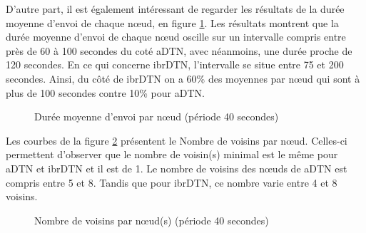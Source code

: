 \documentclass[a4paper,10pt]{article}
\begin{document}
D’autre part, il est également intéressant de regarder les résultats de la durée moyenne d'envoi de chaque nœud, en figure \ref{fig:40_avg_snd_duration}. Les résultats montrent que la durée moyenne d'envoi de chaque nœud oscille sur un intervalle compris entre près de 60 à 100 secondes du coté aDTN, avec néanmoins, une durée proche de 120 secondes. En ce qui concerne ibrDTN, l’intervalle se situe entre 75 et 200 secondes. Ainsi, du côté de ibrDTN on a 60\% des moyennes par nœud qui sont à plus de 100 secondes contre 10\% pour aDTN.\par

\begin{figure}[h!]
    \centering
    \caption{Durée moyenne d'envoi par nœud (période 40 secondes)}
    \label{fig:40_avg_snd_duration}
\end{figure}

Les courbes de la figure \ref{fig:40_nb_neighbors} présentent le Nombre de voisins par nœud. Celles-ci permettent d'observer que le nombre de voisin(s) minimal est le même pour aDTN et ibrDTN et il est de 1. Le nombre de voisins des nœuds de aDTN est compris entre 5 et 8. Tandis que pour ibrDTN, ce nombre varie entre 4 et 8 voisins.

\begin{figure}[h!]
    \centering
    \caption{Nombre de voisins par nœud(s) (période 40 secondes)}
    \label{fig:40_nb_neighbors}
\end{figure}
\end{document}

